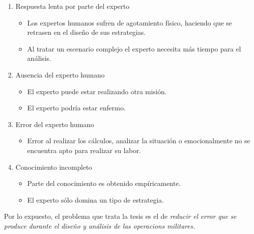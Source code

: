 \begin{enumerate}
  \renewcommand{\labelitemi}{-}  %

\item Respuesta lenta por parte del experto

  \begin{itemize}
  \item Los expertos humanos sufren de agotamiento físico, haciendo que se retrasen en el diseño de sus estrategias.
  \item Al tratar un escenario complejo el experto necesita más tiempo para el análisis.
  \end{itemize}

\item Ausencia del experto humano

  \begin{itemize}
  \item El experto puede estar realizando otra misión.
  \item El experto podría estar enfermo.
  \end{itemize}

\item Error del experto humano

  \begin{itemize}
  \item Error al realizar los cálculos, analizar la situación o emocionalmente no se encuentra apto para realizar su labor.
  \end{itemize}

\item Conocimiento incompleto

  \begin{itemize}
  \item Parte del conocimiento es obtenido empíricamente.
  \item El experto sólo domina un tipo de estrategia.
  \end{itemize}

\end{enumerate}

Por lo expuesto, el problema que trata la tesis es el de \emph{reducir el error que se produce durante el diseño y análisis de las \glspl{operacion} militares.}

